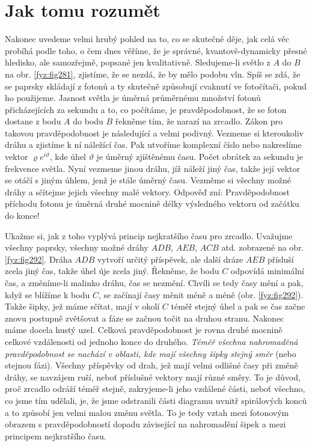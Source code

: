 {  \section{Jak tomu rozumět}\label{fyz:IchapXXVIsecVI}
    Nakonec uvedeme velmi hrubý pohled na to, co se skutečně děje, jak celá věc probíhá podle toho, 
    o čem dnes věříme, že je správné, kvantově-dynamicky přesné hledisko, ale samozřejmě, popsané 
    jen kvalitativně. Sledujeme-li světlo z \(A\) do \(B\) na obr. \ref{fyz:fig281}, zjistíme, že 
    se nezdá, že by mělo podobu vln. Spíš se zdá, že se paprsky skládají z fotonů a ty skutečně 
    způsobují cvaknutí ve fotočítači, pokud ho použijeme. Jasnost světla je úměrná průměrnému 
    množství fotonů přicházejících za sekundu a to, co počítáme, je pravděpodobnost, že se foton 
    dostane z bodu \(A\) do bodu \(B\) řekněme tím, že narazí na zrcadlo. Zákon pro takovou 
    pravděpodobnost je následující a velmi podivný. Vezmeme si kteroukoliv dráhu a zjistíme k ní 
    náležící čas. Pak utvoříme komplexní číslo nebo nakreslíme vektor \(\varrho e^{i\vartheta}\), 
    kde úhel \(\vartheta\) je úměrný zjištěnému času. Počet obrátek za sekundu je frekvence 
    světla. Nyní vezmeme jinou dráhu, jíž náleží jiný čas, takže její vektor se otáčí s jiným 
    úhlem, jenž je stále úměrný času. Vezměme si všechny možné dráhy a sčítejme jejich všechny malé 
    vektory. Odpověď zní: Pravděpodobnost příchodu fotonu je úměrná druhé mocnině délky výsledného 
    vektoru od začátku do konce!
    
    Ukažme si, jak z toho vyplývá princip nejkratšího času pro zrcadlo. Uvažujme všechny paprsky, 
    všechny možné dráhy \(ADB\), \(AEB\), \(ACB\) atd. zobrazené na obr. \ref{fyz:fig292}. Dráha 
    \(ADB\) vytvoří určitý příspěvek, ale další dráze \(AEB\) přísluší zcela jiný čas, takže úhel 
    úje zcela jiný. Řekněme, že bodu \(C\) odpovídá minimální čas, a změníme-li malinko dráhu, čas 
    se nezmění. Chvíli se tedy časy mění a pak, když se blížíme k bodu \(C\), se začínají časy 
    měnit méně a méně (obr. \ref{fyz:fig292}). Takže šipky, jež máme sčítat, mají v okolí \(C\) 
    téměř stejný úhel a pak se čas začne znovu postupně zvětšovat a fáze se začnou točit na druhou 
    stranu. Nakonec máme docela hustý uzel. Celková pravděpodobnost je rovna druhé mocnině celkové 
    vzdálenosti od jednoho konce do druhého. \emph{Téměř všechna nahromaděná pravděpodobnost se 
    nachází v oblasti, kde mají všechny šipky stejný směr} (nebo stejnou fázi). Všechny příspěvky 
    od drah, jež mají velmi odlišné časy při změně dráhy, se navzájem ruší, neboť příslušné vektory 
    mají různé směry. To je důvod, proč zrcadlo odráží téměř stejně, zakryjeme-li jeho vzdálené 
    části, neboť všechno, co jsme tím udělali, je, že jsme odstranili části diagramu uvnitř 
    spirálových konců a to způsobí jen velmi malou změnu světla. To je tedy vztah mezi fotonovým 
    obrazem s pravděpodobností dopadu závisející na nahromadění šipek a mezi principem nejkratšího 
    času.
    
}
